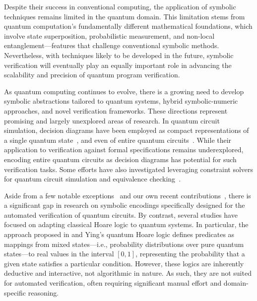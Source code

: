 Despite their success in conventional computing, the application of symbolic techniques remains limited in the quantum domain.
%
This limitation stems from quantum computation’s fundamentally different mathematical foundations, which involve state superposition, probabilistic measurement, and non-local entanglement—features that challenge conventional symbolic methods.
%
Nevertheless, with techniques likely to be developed in the future, symbolic verification will eventually play an equally important role in advancing the scalability and precision of quantum program verification.
%

As quantum computing continues to evolve, there is a growing need to develop symbolic abstractions tailored to quantum systems, hybrid symbolic-numeric approaches, and novel verification frameworks. These directions represent promising and largely unexplored areas of research.
%
In quantum circuit simulation, decision diagrams have been employed as compact representations of a single quantum state~\citep{TsaiJiangJhang2021,ChenChenJiangJobranovaLengal2024,KissingerWetering2022,10.1145/3712711,7163590,8942057}, and even of entire quantum circuits~\citep{WeiTsaiJhangJiang2022,SistlaChaudhuriReps2023,BurgholzerWille2020,Vinkhuijzen2023limdd}. While their application to verification against formal specifications remains underexplored, encoding entire quantum circuits as decision diagrams has potential for such verification tasks. Some efforts have also investigated leveraging constraint solvers for quantum circuit simulation and equivalence checking~\citep{MeiBonsangueLaarman2024Sim,MeiCoopmansLaarman2024Eq}.


Aside from a few notable exceptions~\citep{DBLP:journals/pacmpl/0001CLLTY23,DBLP:conf/fm/BauerMarquartLS23,Chareton2021,amy2018towards,fang2024symbolic} and our own recent contributions~\citep{PLanQC25,DBLP:journals/pacmpl/AbdullaCCHLLLT25,CACM25,ChenCLLTY23,ChenCLLT23,chen2025autoq}, there is a significant gap in research on symbolic encodings specifically designed for the automated verification of quantum circuits.
%
By contrast, several studies have focused on adapting classical Hoare logic to quantum systems. In particular, the approach proposed in \citep{d2006quantum} and Ying’s quantum Hoare logic \citep{ying2012floyd} defines predicates as mappings from mixed states—i.e., probability distributions over pure quantum states—to real values in the interval $[0,1]$, representing the probability that a given state satisfies a particular condition.
%
However, these logics are inherently deductive and interactive, not algorithmic in nature. As such, they are not suited for automated verification, often requiring significant manual effort and domain-specific reasoning.
%

